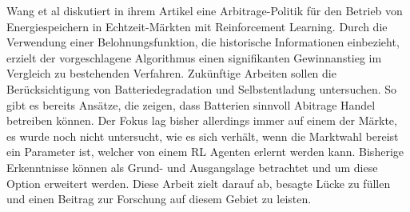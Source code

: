 \documentclass[a4paper, 11pt]{article}
\begin{document}
Wang et al \cite{wang_energy_2018} diskutiert in ihrem Artikel eine Arbitrage-Politik für den Betrieb von Energiespeichern in Echtzeit-Märkten mit Reinforcement Learning. Durch die Verwendung einer Belohnungsfunktion, die historische Informationen einbezieht, erzielt der vorgeschlagene Algorithmus einen signifikanten Gewinnanstieg im Vergleich zu bestehenden Verfahren. Zukünftige Arbeiten sollen die Berücksichtigung von Batteriedegradation und Selbstentladung untersuchen.
So gibt es bereits Ansätze, die zeigen, dass Batterien sinnvoll Abitrage Handel betreiben können. Der Fokus lag bisher allerdings immer auf einem der Märkte, es wurde noch nicht untersucht, wie es sich verhält, wenn die Marktwahl bereist ein Parameter ist, welcher von einem RL Agenten erlernt werden kann. Bisherige Erkenntnisse können als Grund- und Ausgangslage betrachtet und um diese Option erweitert werden.
Diese Arbeit zielt darauf ab, besagte Lücke zu füllen und einen Beitrag zur Forschung auf diesem Gebiet zu leisten.
\end{document}
